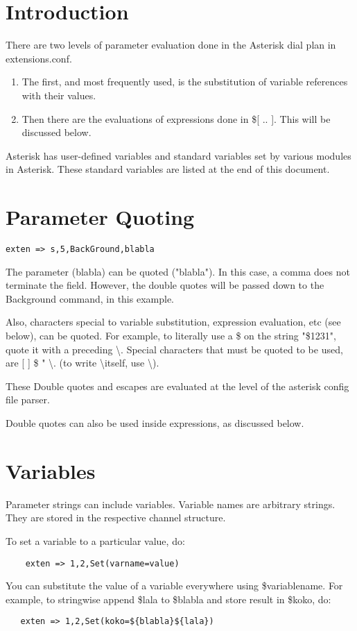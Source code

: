 \section{Introduction}

There are two levels of parameter evaluation done in the Asterisk
dial plan in extensions.conf.
\begin{enumerate}
\item The first, and most frequently used, is the substitution of variable
  references with their values. 
\item Then there are the evaluations of expressions done in \$[ .. ]. 
  This will be discussed below.
\end{enumerate}
Asterisk has user-defined variables and standard variables set
by various modules in Asterisk. These standard variables are
listed at the end of this document.

\section{Parameter Quoting}
\begin{verbatim}
exten => s,5,BackGround,blabla
\end{verbatim}
The parameter (blabla) can be quoted ("blabla"). In this case, a 
comma does not terminate the field. However, the double quotes
will be passed down to the Background command, in this example.

Also, characters special to variable substitution, expression evaluation, etc
(see below), can be quoted. For example, to literally use a \$ on the 
string "\$1231", quote it with a preceding \textbackslash. Special characters that must
be quoted to be used, are [ ] \$ " \textbackslash. (to write \textbackslash itself, use \textbackslash). 

These Double quotes and escapes are evaluated at the level of the
asterisk config file parser. 

Double quotes can also be used inside expressions, as discussed below.

\section{Variables}

Parameter strings can include variables. Variable names are arbitrary strings. 
They are stored in the respective channel structure. 

To set a variable to a particular value, do: 
\begin{verbatim}
    exten => 1,2,Set(varname=value)
\end{verbatim}
You can substitute the value of a variable everywhere using \${variablename}.
For example, to stringwise append \$lala to \$blabla and store result in \$koko, 
do: 
\begin{verbatim}
   exten => 1,2,Set(koko=${blabla}${lala})
\end{verbatim}


